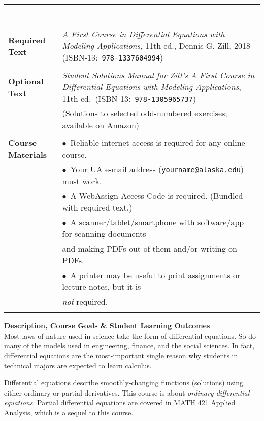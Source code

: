 \documentclass[12pt]{article}
\renewcommand{\emph}[1]{\textsf{\textbf{#1}}}
\newcommand{\localhead}[1]{\par\smallskip\textbf{#1}\nobreak\\}%
\def\heading#1{\localhead{\large\emph{#1}}}
\begin{document}
\begin{tabularx}{\textwidth}{lX}
\begin{tabular}[t]{ll}
                  \end{tabular} \\
 & \\
\emph{Required Text}     & \textsl{A First Course in Differential Equations with Modeling Applications}, 11th ed., Dennis G. Zill, 2018 (ISBN-13:\, \texttt{978-1337604994}) \\
 & \\
\emph{Optional Text}     & \textit{Student Solutions Manual for Zill's A First Course in Differential Equations with Modeling Applications}, 11th ed.~(ISBN-13:\, \texttt{978-1305965737}) \\
    & (Solutions to selected odd-numbered exercises; available on Amazon) \\
 & \\
\emph{Course Materials}  & $\bullet$\, Reliable internet access is required for any online course. \\
                         & $\bullet$\, Your UA e-mail address (\texttt{yourname@alaska.edu}) must work. \\
                         & $\bullet$\, A WebAssign Access Code is required.  (Bundled with required text.) \\
                         & $\bullet$\, A scanner/tablet/smartphone with software/app for scanning documents \\
                         & \quad and making PDFs out of them and/or writing on PDFs. \\
                         & $\bullet$\, A printer may be useful to print assignments or lecture notes, but it is \\
                         & \quad \textsl{not} required. \\
 & 
\end{tabularx}

\vfill

\newpage
\cfoot{\thepage}
\strut

\heading{Description, Course Goals \& Student Learning Outcomes}
Most laws of nature used in science take the form of differential equations.  So do many of the models used in engineering, finance, and the social sciences.  In fact, differential equations are the most-important single reason why students in technical majors are expected to learn calculus.

Differential equations describe smoothly-changing functions (solutions) using either ordinary or partial derivatives.  This course is about \textsl{ordinary differential equations}.  Partial differential equations are covered in MATH 421 Applied Analysis, which is a sequel to this course.
\end{document}
